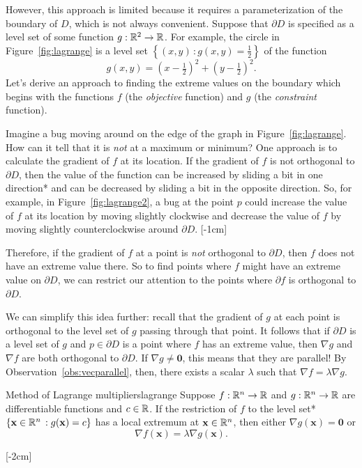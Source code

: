 \documentclass{watsonbook}
\begin{document}
However, this approach is limited because it requires a
parameterization of the boundary of $D$, which is not always
convenient. Suppose that $\partial D$ is specified as a level set of
some function $g: \mathbb{R}^2 \to \mathbb{R}$. For example, the
circle in Figure~\ref{fig:lagrange} is a level set $\left\{(x,y) \, :
  g(x,y) = \tfrac{1}{2}\right\}$ of the function
\[
  g(x,y) = \left(x-\tfrac{1}{2}\right)^2 + \left(y-\tfrac{1}{2}\right)^2. 
\]
Let's derive an approach to finding the extreme values on the
boundary which begins with the functions $f$ (the \textit{objective}
function) and $g$ (the \textit{constraint} function).


Imagine a bug moving around on the edge of the graph in
Figure~\ref{fig:lagrange}. How can it tell that it is \textit{not} at
a maximum or minimum? One approach is to calculate the gradient of $f$
at its location. If the gradient of $f$ is not orthogonal to
$\partial D$, then the value of the function can be increased by
sliding a bit in one direction* and can be decreased by sliding a bit
in the opposite direction. So, for example, in
Figure~\ref{fig:lagrange2}, a bug at the point $p$ could increase the
value of $f$ at its location by moving slightly clockwise and decrease
the value of $f$ by moving slightly counterclockwise around
$\partial D$. [-1cm]

Therefore, if the gradient of $f$ at a point is \textit{not}
orthogonal to $\partial D$, then $f$ does not have an extreme value
there. So to find points where $f$ might have an extreme value on
$\partial D$, we can restrict our attention to the points where
$\partial f$ is orthogonal to $\partial D$.

We can simplify this idea further: recall that the gradient of $g$ at
each point is orthogonal to the level set of $g$ passing through that
point. It follows that if $\partial D$ is a level set of $g$ and
$p \in \partial D$ is a point where $f$ has an extreme value, then
$\nabla g$ and $\nabla f$ are both orthogonal to $\partial D$. If
$\nabla g \neq \mathbf{0}$, this means that they are parallel! By
Observation~\ref{obs:vecparallel}, then, there exists a scalar
$\lambda$ such that $\nabla f = \lambda \nabla g$.

\begin{theo}{Method of Lagrange multipliers}{lagrange}
  Suppose $f: \mathbb{R}^n \to \mathbb{R}$ and $g:\mathbb{R}^n \to \mathbb{R}$ are differentiable
  functions and $c \in \mathbb{R}$. If the restriction of $f$ to the level
  set* $\{\mathbf{x} \in \mathbb{R}^n \,: g(\mathbf{x}) = c\}$ has a local
  extremum at $\mathbf{x} \in \mathbb{R}^n$, then either $\nabla g(\mathbf{x}) =
  \mathbf{0}$ or 
  \[
    \nabla f (\mathbf{x}) = \lambda \nabla g (\mathbf{x}). 
  \]
\end{theo} [-2cm]
\end{document}
